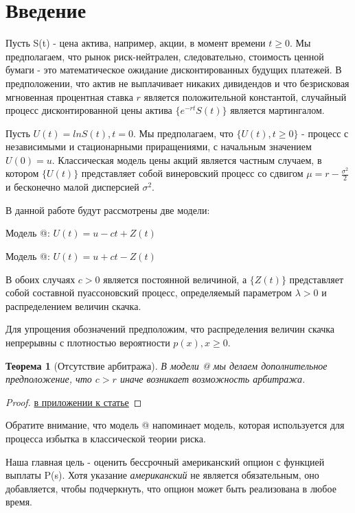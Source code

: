 \documentclass[a4paper,12pt]{article}
\makeatletter
\newtheorem{theorem}{Теорема}
\theoremstyle{definition}
\newcommand{\proofref}[1]{\hyperlink{#1}{в приложении к статье}}
\newcommand*{\rom}[1]{\expandafter\@slowromancap\romannumeral #1@}
\makeatother
\begin{document}

\section{Введение}

Пусть S(t) - цена актива, например, акции, в момент времени $t \ge 0$. Мы предполагаем, что рынок риск-нейтрален, следовательно, стоимость ценной бумаги - это математическое ожидание дисконтированных будущих платежей. В предположении, что актив не выплачивает никаких дивидендов и что безрисковая мгновенная процентная ставка $r$ является положительной константой, случайный процесс дисконтированной цены актива $\{e^{-rt} S(t)\}$ является мартингалом.

Пусть $U(t) = ln S(t), t = 0$. Мы предполагаем, что $\{U(t), t \ge 0\}$ - процесс с независимыми и стационарными приращениями, с начальным значением $U(0) = u$. Классическая модель цены акций является частным случаем, в котором $\{U(t)\}$ представляет собой винеровский процесс со сдвигом $\mu = r - \frac{\sigma ^ {2}}{2}$ и бесконечно малой дисперсией $\sigma ^ {2}$. 

В данной работе будут рассмотрены две модели:

Модель \rom{1}: $U(t) = u - ct + Z(t)$

Модель \rom{2}: $U(t) = u + ct - Z(t)$

В обоих случаях $c > 0$ является постоянной величиной, а $\{Z(t)\}$ представляет собой составной пуассоновский процесс, определяемый параметром $\lambda > 0$ и распределением величин скачка. 

\label{sec:positivityOfJumsAssumption} Для упрощения обозначений предположим, что распределения величин скачка
непрерывны с плотностью вероятности $p(x), x \ge 0$. 

\begin{theorem}[Отсутствие арбитража]\label{thm:no_arbitrage_theoreme}
В модели \rom{2} мы делаем дополнительное предположение, что $c > r$ иначе возникает возможность арбитража. 
\end{theorem}
\begin{proof}
\proofref{thm:no_arbitrage_theoreme}
\end{proof}

Обратите внимание, что модель \rom{2} напоминает модель, которая используется для процесса избытка в классической теории риска.

Наша главная цель - оценить бессрочный американский
опцион с функцией выплаты P(s). Хотя указание \textit{американский} не является обязательным, оно добавляется, чтобы подчеркнуть, что опцион может быть реализована в любое время.
\end{document}
